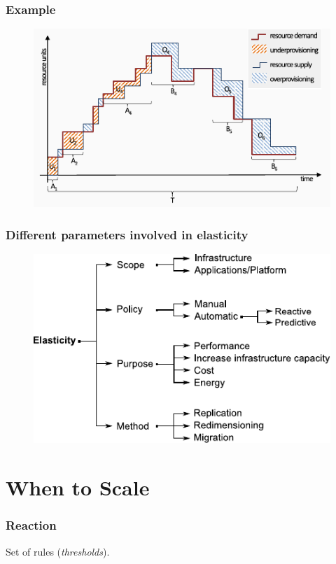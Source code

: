 \documentclass{beamer}
\begin{document}
\begin{frame}
  \frametitle{Example~\cite{herbst2013elasticity}}
  \begin{figure}
    \includegraphics[clip, width=\textwidth]{images/workload}
  \end{figure}
\end{frame}

\begin{frame}
  \frametitle{Different parameters involved in elasticity}
  \begin{figure}
    \includegraphics[width=\textwidth]{images/elasticity2}
  \end{figure}
\end{frame}


\section{When to Scale}
\begin{frame}
  \frametitle{Reaction}
  Set of rules (\textit{thresholds}).
\end{frame}
\end{document}
